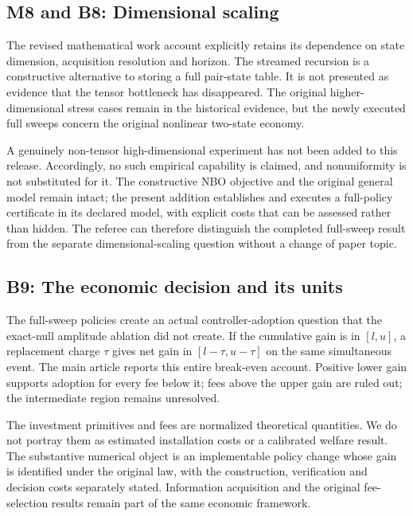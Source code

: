 \hypertarget{m8-and-b8-dimensional-scaling}{%
\subsection{M8 and B8: Dimensional
scaling}\label{m8-and-b8-dimensional-scaling}}

The revised mathematical work account explicitly retains its dependence
on state dimension, acquisition resolution and horizon. The streamed
recursion is a constructive alternative to storing a full pair-state
table. It is not presented as evidence that the tensor bottleneck has
disappeared. The original higher-dimensional stress cases remain in the
historical evidence, but the newly executed full sweeps concern the
original nonlinear two-state economy.

A genuinely non-tensor high-dimensional experiment has not been added to
this release. Accordingly, no such empirical capability is claimed, and
nonuniformity is not substituted for it. The constructive NBO objective
and the original general model remain intact; the present addition
establishes and executes a full-policy certificate in its declared
model, with explicit costs that can be assessed rather than hidden. The
referee can therefore distinguish the completed full-sweep result from
the separate dimensional-scaling question without a change of paper
topic.

\hypertarget{b9-the-economic-decision-and-its-units}{%
\subsection{B9: The economic decision and its
units}\label{b9-the-economic-decision-and-its-units}}

The full-sweep policies create an actual controller-adoption question
that the exact-null amplitude ablation did not create. If the cumulative
gain is in \([l,u]\), a replacement charge \(\tau\) gives net gain in
\([l-\tau,u-\tau]\) on the same simultaneous event. The main article
reports this entire break-even account. Positive lower gain supports
adoption for every fee below it; fees above the upper gain are ruled
out; the intermediate region remains unresolved.

The investment primitives and fees are normalized theoretical
quantities. We do not portray them as estimated installation costs or a
calibrated welfare result. The substantive numerical object is an
implementable policy change whose gain is identified under the original
law, with the construction, verification and decision costs separately
stated. Information acquisition and the original fee-selection results
remain part of the same economic framework.

